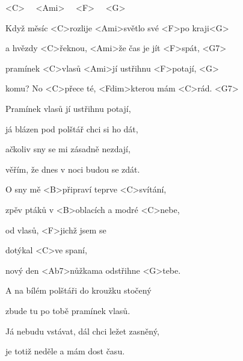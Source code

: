 

<C>~~ <Ami>~~ <F>~~ <G>

\zs
Když měsíc <C>rozlije <Ami>světlo své <F>po kraji<G>

a hvězdy <C>řeknou, <Ami>že čas je jít <F>spát, <G7>

pramínek <C>vlasů <Ami>jí ustřihnu <F>potají, <G>

komu? No <C>přece té, <Fdim>kterou mám <C>rád. <G7>
\ks

\zs
Pramínek vlasů jí ustřihnu potají,

já blázen pod polštář chci si ho dát,

ačkoliv sny se mi zásadně nezdají,

věřím, že dnes v noci budou se zdát.
\ks

\zr
O sny mě <B>připraví teprve <C>svítání,

zpěv ptáků v <B>oblacích a modré <C>nebe,

od vlasů, <F>jichž jsem se

dotýkal <C>ve spaní,

nový den <Ab7>nůžkama odstřihne <G>tebe.
\kr

\zs
A na bílém polštáři do kroužku stočený

zbude tu po tobě pramínek vlasů.

Já nebudu vstávat, dál chci ležet zasněný,

je totiž neděle a mám dost času.
\ks

\zr \kr

\kp


















